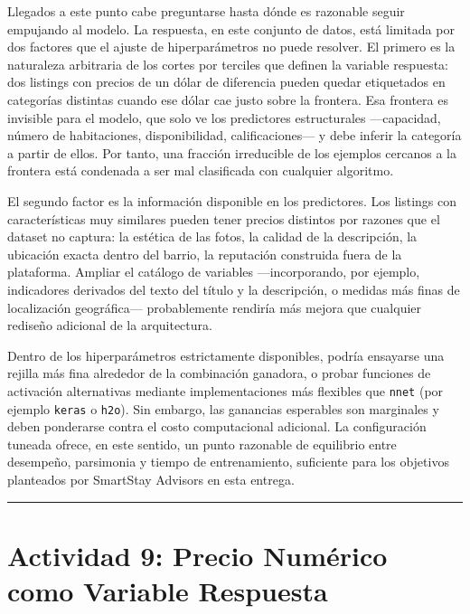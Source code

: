 \documentclass[
]{article}
\begin{document}
Llegados a este punto cabe preguntarse hasta dónde es razonable seguir
empujando al modelo. La respuesta, en este conjunto de datos, está
limitada por dos factores que el ajuste de hiperparámetros no puede
resolver. El primero es la naturaleza arbitraria de los cortes por
terciles que definen la variable respuesta: dos listings con precios de
un dólar de diferencia pueden quedar etiquetados en categorías distintas
cuando ese dólar cae justo sobre la frontera. Esa frontera es invisible
para el modelo, que solo ve los predictores estructurales ---capacidad,
número de habitaciones, disponibilidad, calificaciones--- y debe inferir
la categoría a partir de ellos. Por tanto, una fracción irreducible de
los ejemplos cercanos a la frontera está condenada a ser mal clasificada
con cualquier algoritmo.

El segundo factor es la información disponible en los predictores. Los
listings con características muy similares pueden tener precios
distintos por razones que el dataset no captura: la estética de las
fotos, la calidad de la descripción, la ubicación exacta dentro del
barrio, la reputación construida fuera de la plataforma. Ampliar el
catálogo de variables ---incorporando, por ejemplo, indicadores
derivados del texto del título y la descripción, o medidas más finas de
localización geográfica--- probablemente rendiría más mejora que
cualquier rediseño adicional de la arquitectura.

Dentro de los hiperparámetros estrictamente disponibles, podría
ensayarse una rejilla más fina alrededor de la combinación ganadora, o
probar funciones de activación alternativas mediante implementaciones
más flexibles que \texttt{nnet} (por ejemplo \texttt{keras} o
\texttt{h2o}). Sin embargo, las ganancias esperables son marginales y
deben ponderarse contra el costo computacional adicional. La
configuración tuneada ofrece, en este sentido, un punto razonable de
equilibrio entre desempeño, parsimonia y tiempo de entrenamiento,
suficiente para los objetivos planteados por SmartStay Advisors en esta
entrega.

\begin{center}\rule{0.5\linewidth}{0.5pt}\end{center}

\section{Actividad 9: Precio Numérico como Variable
Respuesta}\label{actividad-9-precio-numuxe9rico-como-variable-respuesta}
\end{document}
